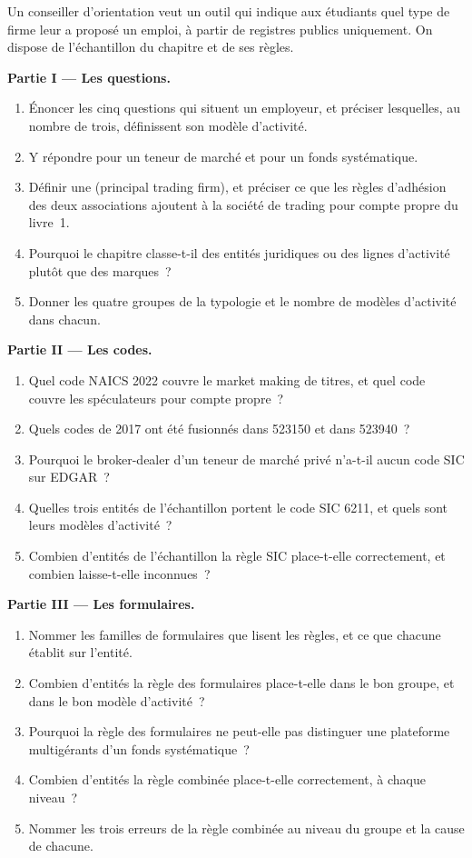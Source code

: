 \begin{problem}\label{pb:in:a-map-of-the-industry:1}
Un conseiller d'orientation veut un outil qui indique aux étudiants quel type de firme leur a proposé un emploi, à partir de registres publics uniquement.
On dispose de l'échantillon du chapitre et de ses règles.

\medskip\noindent\textbf{Partie I --- Les questions.}
\begin{enumerate}
\item Énoncer les cinq questions qui situent un employeur, et préciser lesquelles, au nombre de trois, définissent son modèle d'activité.
\item Y répondre pour un teneur de marché et pour un fonds systématique.
\item Définir une  (principal trading firm), et préciser ce que les règles d'adhésion des deux associations
ajoutent à la société de trading pour compte propre du livre~1.
\item Pourquoi le chapitre classe-t-il des entités juridiques ou des lignes d'activité plutôt que des marques~?
\item Donner les quatre groupes de la typologie et le nombre de modèles d'activité dans chacun.
\end{enumerate}

\medskip\noindent\textbf{Partie II --- Les codes.}
\begin{enumerate}[resume]
\item Quel code NAICS 2022 couvre le market making de titres, et quel code couvre les spéculateurs pour compte propre~?
\item Quels codes de 2017 ont été fusionnés dans 523150 et dans 523940~?
\item Pourquoi le broker-dealer d'un teneur de marché privé n'a-t-il aucun code SIC sur EDGAR~?
\item Quelles trois entités de l'échantillon portent le code SIC 6211, et quels sont leurs modèles d'activité~?
\item Combien d'entités de l'échantillon la règle SIC place-t-elle correctement, et combien laisse-t-elle inconnues~?
\end{enumerate}

\medskip\noindent\textbf{Partie III --- Les formulaires.}
\begin{enumerate}[resume]
\item Nommer les familles de formulaires que lisent les règles, et ce que chacune établit sur l'entité.
\item Combien d'entités la règle des formulaires place-t-elle dans le bon groupe, et dans le bon modèle d'activité~?
\item Pourquoi la règle des formulaires ne peut-elle pas distinguer une plateforme multigérants d'un fonds systématique~?
\item Combien d'entités la règle combinée place-t-elle correctement, à chaque niveau~?
\item Nommer les trois erreurs de la règle combinée au niveau du groupe et la cause de chacune.
\end{enumerate}


\end{problem}
